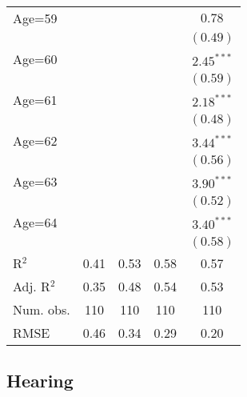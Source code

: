 \documentclass[fullpage]{paper}
\begin{document}
\begin{center}
\begin{longtable}{l c c c c }
Age=59      &              &               &               & $0.78$        \\
            &              &               &               & $(0.49)$      \\
Age=60      &              &               &               & $2.45^{***}$  \\
            &              &               &               & $(0.59)$      \\
Age=61      &              &               &               & $2.18^{***}$  \\
            &              &               &               & $(0.48)$      \\
Age=62      &              &               &               & $3.44^{***}$  \\
            &              &               &               & $(0.56)$      \\
Age=63      &              &               &               & $3.90^{***}$  \\
            &              &               &               & $(0.52)$      \\
Age=64      &              &               &               & $3.40^{***}$  \\
            &              &               &               & $(0.58)$      \\
\hline
R$^2$       & 0.41         & 0.53          & 0.58          & 0.57          \\
Adj. R$^2$  & 0.35         & 0.48          & 0.54          & 0.53          \\
Num. obs.   & 110          & 110           & 110           & 110           \\
RMSE        & 0.46         & 0.34          & 0.29          & 0.20          \\
\end{longtable}
\end{center}
\subsection{ Hearing }
\end{document}
